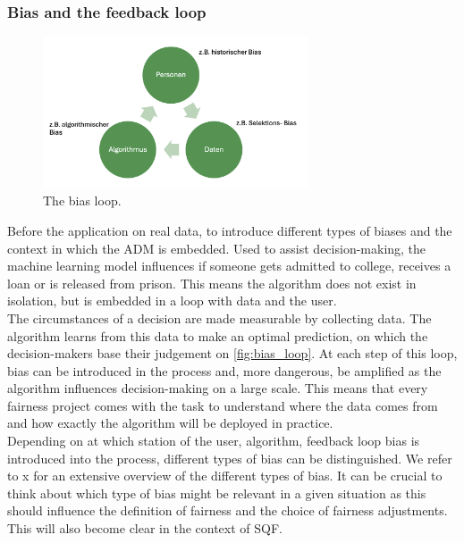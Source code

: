 \subsubsection*{Bias and the feedback loop}
\begin{figure}
    \centering
    \includegraphics[width=0.7\textwidth]{../figures/bias_loop.png}
    \caption{The bias loop.}
    \label{fig:bias_loop}
\end{figure}

Before the application on real data, to introduce different types of biases and the context in which the ADM is embedded.
Used to assist decision-making, the machine learning model influences if someone gets admitted to college, receives a loan or is released from prison. This means the algorithm does not exist in isolation, but is embedded in a loop with data and the user.\\
The circumstances of a decision are made measurable by collecting data. The algorithm learns from this data to make an optimal prediction, on which the decision-makers base their judgement on \autoref{fig:bias_loop}. At each step of this loop, bias can be introduced in the process and, more dangerous, be amplified as the algorithm influences decision-making on a large scale.
This means that every fairness project comes with the task to understand where the data comes from and how exactly the algorithm will be deployed in practice.\\
Depending on at which station of the user, algorithm, feedback loop bias is introduced into the process, different types of bias can be distinguished. We refer to x for an extensive overview of the different types of bias. It can be crucial to think about which type of bias might be relevant in a given situation as this should influence the definition of fairness and the choice of fairness adjustments. This will also become clear in the context of SQF.\\

